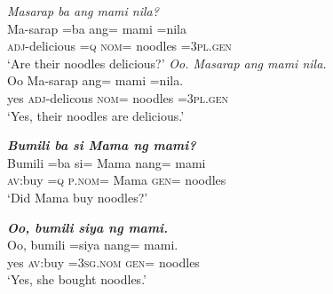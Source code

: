\documentclass[output=paper]{langsci/langscibook}
\begin{document}
\begin{exe}
	\ex\label{l}
	\begin{xlist}
		 \textit{Masarap ba ang mami nila?}\\
		\gll Ma-sarap  =ba  ang=  mami    =nila{\USQMark}\\
		\textsc{adj}-delicious  =\textsc{q}  \textsc{nom}=  noodles  =\textsc{3pl}.\textsc{gen}\\
		\glt ‘Are their noodles delicious?’
		  \textit{Oo. Masarap ang mami nila.}\\
		\gll Oo  Ma-sarap  ang=  mami    =nila.\\
		yes  \textsc{adj}-delicous  \textsc{nom}=  noodles  =\textsc{3pl}.\textsc{gen}\\
		\glt ‘Yes, their noodles are delicious.’
	\end{xlist}
\end{exe}

\begin{exe}
	\ex\label{m}
	\begin{xlist}
		 \textit{\textbf{Bumili ba si Mama ng mami?}}\\
		\gll B{\USSmaller}um{\USGreater}ili  =ba  si=    Mama  nang=  mami{\USQMark}\\
		\textsc{av}:buy  =\textsc{q} \textsc{p}.\textsc{nom}=  Mama  \textsc{gen}=  noodles\\
		\glt ‘Did Mama buy noodles?’
		
		\newpage 
		  \textit{\textbf{Oo, bumili siya ng mami.}}\\
		\gll Oo,  b{\USSmaller}um{\USGreater}ili  =siya    nang=  mami.\\
		yes  \textsc{av}:buy  =\textsc{3sg}.\textsc{nom} \textsc{gen}=  noodles\\
		\glt ‘Yes, she bought noodles.’
	\end{xlist}
\end{exe}

\printbibliography[heading=subbibliography,notkeyword=this]
\end{document}
